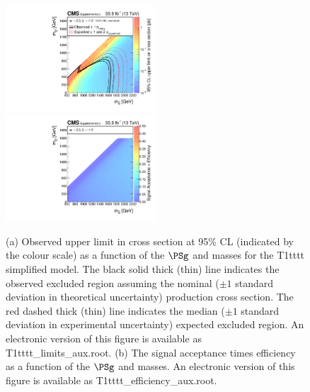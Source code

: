 \begin{figure}
    \begin{center}
            \includegraphics[width=0.50\textwidth]{Supplementary/CMS-SUS-16-038_Figure-aux_017-a}
            \includegraphics[width=0.50\textwidth]{Supplementary/CMS-SUS-16-038_Figure-aux_017-b}
        \caption{ (a) Observed upper limit in cross section at 95\% CL (indicated
        by the colour scale) as a function of 
        the $\PSg$ and \PSGczDo %
        masses for the 
        T1tttt %
        simplified  model.  The  black  solid thick  (thin)  line indicates  the
        observed  excluded  region  assuming   the  nominal  (${\pm}1$  standard
        deviation in theoretical uncertainty)  production cross section. The red
        dashed  thick  (thin)  line  indicates  the  median  (${\pm}1$  standard
        deviation in experimental uncertainty) expected excluded region.
    An electronic version of this figure is available as T1tttt\_limits\_aux.root.
        (b) The signal acceptance times efficiency as a function of 
        the $\PSg$ and \PSGczDo %
        masses.
    An electronic version of this figure is available as T1tttt\_efficiency\_aux.root.
        }
        \label{fig:T1tttt}
    \end{center}
\end{figure}

